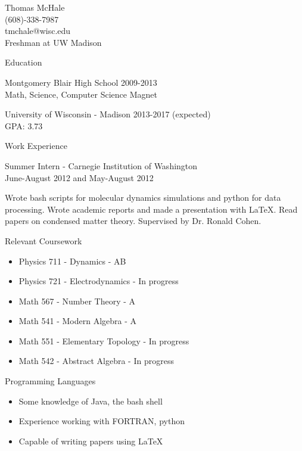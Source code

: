 \documentclass{letter}
\begin{document}
\begin{flushright}
Thomas McHale\\
(608)-338-7987\\
tmchale@wisc.edu\\
Freshman at UW Madison
\end{flushright}


{\Large Education}

Montgomery Blair High School 2009-2013	\\
Math, Science, Computer Science Magnet

University of Wisconsin - Madison 2013-2017 (expected)\\
GPA: 3.73

{\Large Work Experience}

{\large Summer Intern - Carnegie Institution of Washington\\
June-August 2012 and May-August 2012}

Wrote bash scripts for molecular dynamics simulations and python for data processing. Wrote academic reports and made a presentation with \LaTeX. Read papers on condensed matter theory. Supervised by Dr. Ronald Cohen.

{\Large Relevant Coursework}

\begin{itemize}
\item Physics 711 - Dynamics - AB
\item Physics 721 - Electrodynamics - In progress
\item Math 567 - Number Theory - A
\item Math 541 - Modern Algebra - A
\item Math 551 - Elementary Topology - In progress
\item Math 542 - Abstract Algebra - In progress
\end{itemize}

{\Large Programming Languages}

\begin{itemize}
\item Some knowledge of Java, the bash shell
\item Experience working with FORTRAN, python
\item Capable of writing papers using \LaTeX
\end{itemize}
\end{document}
